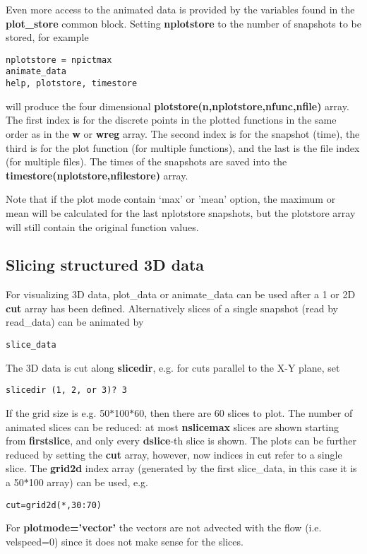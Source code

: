 \documentclass{article}
\begin{document}
   Even more access to the animated data is provided by the variables found in the
   {\bf plot\_store} common block. Setting {\bf nplotstore}
   to the number of snapshots to be stored, for example
\begin{verbatim}
nplotstore = npictmax
animate_data
help, plotstore, timestore
\end{verbatim}
   will produce the four dimensional {\bf plotstore(n,nplotstore,nfunc,nfile)} array.
   The first index is for the discrete points in the plotted functions in the
   same order as in the {\bf w} or {\bf wreg} array.
   The second index is for the snapshot (time), the third is for the
   plot function (for multiple functions), and the last is the file index 
   (for multiple files).
   The times of the snapshots are saved into the {\bf timestore(nplotstore,nfilestore)}
   array. 

   Note that if the plot mode contain `max' or 'mean' option, the 
   maximum or mean will be calculated for the last nplotstore snapshots,
   but the plotstore array will still contain the original function values.

\subsection{Slicing structured 3D data \label{s-slice}}

   For visualizing 3D data, plot\_data or animate\_data can be used after a
   1 or 2D {\bf cut} array has been defined. Alternatively slices of a single
   snapshot (read by read\_data) can be animated by
\begin{verbatim}
slice_data
\end{verbatim}
   The 3D data is cut along {\bf slicedir}, e.g. for cuts parallel to the
   X-Y plane, set
\begin{verbatim}
slicedir (1, 2, or 3)? 3
\end{verbatim}
   If the grid size is e.g. 50$*$100$*$60, then there are 60 slices to plot.
   The number of animated slices can be reduced:
   at most {\bf nslicemax} slices are shown starting from {\bf firstslice},
   and only every {\bf dslice}-th slice is shown.
   The plots can be further reduced by setting the {\bf cut} array,
   however, now indices in cut refer to a single slice. The {\bf grid2d} 
   index array (generated by the first slice\_data, in this case it is a 50$*$100 
   array) can be used, e.g.
\begin{verbatim}
cut=grid2d(*,30:70)
\end{verbatim}
   For {\bf plotmode='vector'} the vectors are not advected with the flow 
   (i.e. velspeed=0) since it does not make sense for the slices.
\end{document}
